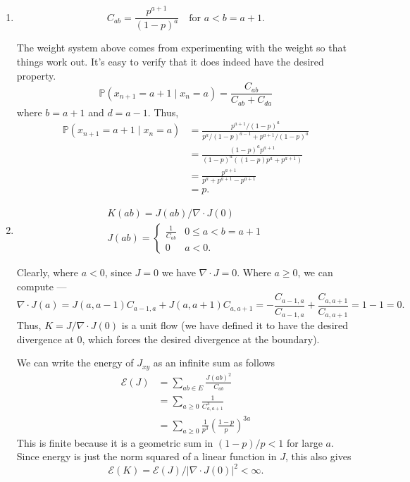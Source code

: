 \documentclass[12 pt, letterpaper]{hmcpset}
\begin{document}
\begin{solution}
	\begin{enumerate}
		\item 
			\[
				\boxed{
					C_{ab} = \frac{p^{a + 1}}{(1 - p)^{a}} \quad \text{for } a < b = a + 1.
				}
			\]

			The weight system above comes from experimenting with the weight so that things work out. It's easy to verify that it does indeed have the desired property.
			\[
				\mathbb{P}(x_{n + 1} = a + 1 \mid x_{n} = a) = \frac{C_{ab}}{C_{ab} + C_{da}}
			\]
			where $b = a + 1$ and $d = a - 1$. Thus,
			\begin{align*}
				\mathbb{P}(x_{n + 1} = a + 1 \mid x_{n} = a) & = \frac{p^{a + 1} / (1 - p)^{a}}{p^{a} / (1 - p)^{a - 1} + p^{a + 1} / (1 - p)^{a}} \\
									     & = \frac{(1 - p)^{a} p^{a + 1}}{(1 - p)^{a}((1 - p) p^{a} + p^{a + 1})} \\
									     & = \frac{p^{a + 1}}{p^{a} + p^{a + 1} - p^{a + 1}} \\
									     & = p.
			\end{align*}
		
		\item 
			\[
				\boxed{
					\begin{gathered}
						K(ab) = J(ab) / \nabla \cdot J(0) \\ 
						J(ab) = \begin{cases}
							\frac{1}{C_{ab}} & 0 \le a < b = a + 1 \\
							0 & a < 0.
						\end{cases}
					\end{gathered}
				}
			\]

			Clearly, where $a < 0$, since $J = 0$ we have $\nabla \cdot J = 0$. Where $a \ge 0$, we can compute ---
			\[
				\nabla \cdot J(a) = J(a, a - 1) C_{a - 1, a} + J(a, a + 1) C_{a, a + 1} = - \frac{C_{a - 1, a}}{C_{a - 1, a}} + \frac{C_{a, a + 1}}{C_{a, a + 1}} = 1 - 1 = 0.
			\]
			Thus, $K = J / \nabla \cdot J(0)$ is a unit flow (we have defined it to have the desired divergence at $0$, which forces the desired divergence at the boundary).

			We can write the energy of $J_{xy}$ as an infinite sum as follows
			\begin{align*}
				\mathcal{E}(J) & = \sum_{ab \in E} \frac{J(ab)^{2}}{C_{ab}} \\
					       & = \sum_{a \ge 0} \frac{1}{C_{a, a + 1}^{3}} \\
					       & = \sum_{a \ge 0} \frac{1}{p^{3}} \left ( \frac{1 - p}{p} \right )^{3a}
			\end{align*}
			This is finite because it is a geometric sum in $(1 - p) / p < 1$ for large $a$. Since energy is just the norm squared of a linear function in $J$, this also gives
			\[
				\mathcal{E}(K) = \mathcal{E}(J) / \lvert \nabla \cdot J(0) \rvert^{2} < \infty.
			\]


\end{enumerate}
\end{solution}
\end{document}

